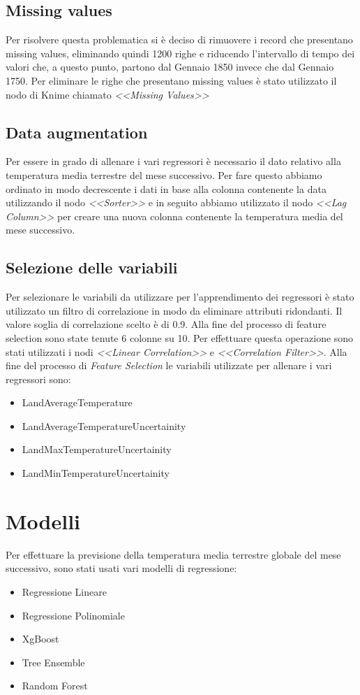 \documentclass[12pt, a4paper, twocolumn]{article} %
\begin{document}
\subsection{Missing values}
Per risolvere questa problematica si è deciso di rimuovere i record che presentano missing values, eliminando quindi 1200 righe e riducendo l'intervallo di tempo dei valori che, a questo punto, partono dal Gennaio 1850 invece che dal Gennaio 1750. Per eliminare le righe che presentano missing values è stato utilizzato il nodo di Knime chiamato \textit{<<Missing Values>>}

\subsection{Data augmentation}
Per essere in grado di allenare i vari regressori è necessario il dato relativo alla temperatura media terrestre del mese successivo. Per fare questo abbiamo ordinato in modo decrescente i dati in base alla colonna contenente la data utilizzando il nodo \textit{<<Sorter>>} e in seguito abbiamo utilizzato il nodo \textit{<<Lag Column>>} per creare una nuova colonna contenente la temperatura media del mese successivo.

\subsection{Selezione delle variabili}
Per selezionare le variabili da utilizzare per l'apprendimento dei regressori è stato utilizzato un filtro di correlazione in modo da eliminare attributi ridondanti. Il valore soglia di correlazione scelto è di 0.9. Alla fine del processo di feature selection sono state tenute 6 colonne su 10. Per effettuare questa operazione sono stati utilizzati i nodi \textit{<<Linear Correlation>>} e \textit{<<Correlation Filter>>}. Alla fine del processo di \textit{Feature Selection} le variabili utilizzate per allenare i vari regressori sono: 
\begin{itemize}
	\item LandAverageTemperature
	\item LandAverageTemperatureUncertainity
	\item LandMaxTemperatureUncertainity
	\item LandMinTemperatureUncertainity
\end{itemize}
\section{Modelli}
Per effettuare la previsione della temperatura media terrestre globale del mese successivo, sono stati usati vari modelli di regressione:
\begin{itemize}
	\item Regressione Lineare
	\item Regressione Polinomiale
	\item XgBoost
	\item Tree Ensemble
	\item Random Forest
\end{itemize}
\end{document}
